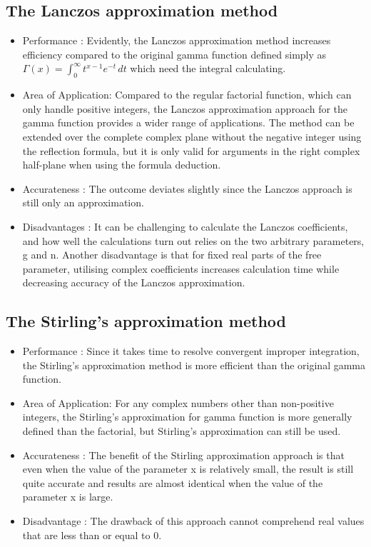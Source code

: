 \documentclass[12pt,a4paper]{report}
\begin{document}
\subsection{ The Lanczos approximation method}
\begin{itemize}
    \item{Performance : Evidently, the Lanczos approximation method increases efficiency compared to the original gamma function defined simply as ${\displaystyle \Gamma (x)=\int _{0}^{\infty }t^{x-1}e^{-t}\,dt}$ which need the integral calculating.}
    
    \item{Area of Application: Compared to the regular factorial function, which can only handle positive integers, the Lanczos approximation approach for the gamma function provides a wider range of applications. The method can be extended over the complete complex plane without the negative integer using the reflection formula, but it is only valid for arguments in the right complex half-plane when using the formula deduction.}
    
    \item{Accurateness : The outcome deviates slightly since the Lanczos approach is still only an approximation.}
    
    \item{Disadvantages : It can be challenging to calculate the Lanczos coefficients, and how well the calculations turn out relies on the two arbitrary parameters, g and n. Another disadvantage is that for fixed real parts of the free parameter, utilising complex coefficients increases calculation time while decreasing accuracy of the Lanczos approximation.}
\end{itemize} 

\subsection{ The Stirling's approximation method}
\begin{itemize}
    \item{Performance : Since it takes time to resolve convergent improper integration, the Stirling's approximation method is more efficient than the original gamma function.}
    
    \item{Area of Application: For any complex numbers other than non-positive integers, the Stirling's approximation for gamma function is more generally defined than the factorial, but Stirling's approximation can still be used.}
    
    \item{Accurateness : The benefit of the Stirling approximation approach is that even when the value of the parameter x is relatively small, the result is still quite accurate and results are almost identical when the value of the parameter x is large.}

    \item{Disadvantage : The drawback of this approach cannot comprehend real values that are less than or equal to $0$.}
\end{itemize}
\end{document}
